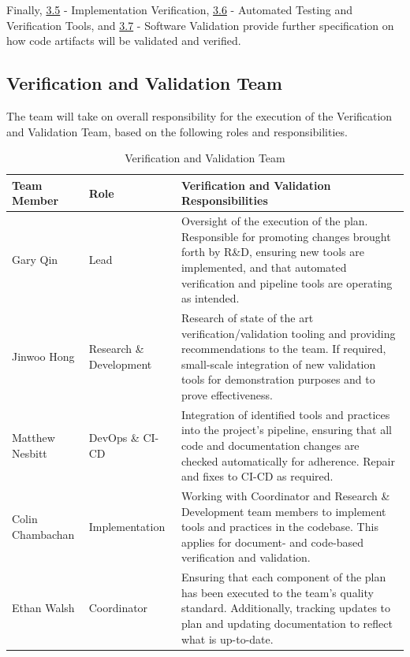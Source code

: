 \documentclass[12pt, titlepage]{article}
\begin{document}
Finally, \hyperref[sec:ImpVer]{3.5} - Implementation Verification, \hyperref[sec:AutoTestVer]{3.6} - Automated Testing and
Verification Tools, and \hyperref[sec:SoftVal]{3.7} - Software Validation provide further specification on how code artifacts
will be validated and verified.

\subsection{Verification and Validation Team}
\label{sec:VnVTeam}

The team will take on overall responsibility for the execution of the Verification and Validation Team, based on the following
roles and responsibilities.

\begin{table}[H]
\centering
\caption{\progname{} Verification and Validation Team}
\label{tab:alternatives}
\begin{tabular}{| p{3.75cm} | p{3.75cm} | p{6.5cm} |}
\hline
\textbf{Team Member} & \textbf{Role} & \textbf{Verification and Validation Responsibilities} \\
\hline
Gary Qin & Lead & Oversight of the execution of the plan. Responsible for promoting changes brought forth by R\&D, ensuring new tools are implemented, and that automated
verification and pipeline tools are operating as intended. \\
\hline
Jinwoo Hong & Research \& Development & Research of state of the art verification/validation tooling and providing recommendations to the team.
If required, small-scale integration of new validation tools for demonstration purposes and to prove effectiveness. \\
\hline
Matthew Nesbitt & DevOps \& CI-CD & Integration of identified tools and practices into the project's pipeline, ensuring that all code and documentation changes
are checked automatically for adherence. Repair and fixes to CI-CD as required. \\
\hline
Colin Chambachan & Implementation & Working with Coordinator and Research \& Development team members to implement tools and practices in the codebase. This
applies for document- and code-based verification and validation. \\
\hline
Ethan Walsh & Coordinator & Ensuring that each component of the plan has been executed to the team's quality standard. 
Additionally, tracking updates to plan and updating documentation to reflect what is up-to-date. \\
\hline
\end{tabular}
\end{table}
\end{document}
